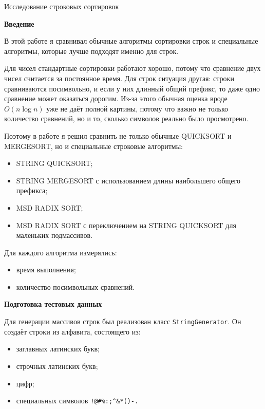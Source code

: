 \documentclass[12pt,a4paper]{article}
\begin{document}
\begin{center}
{\Large Исследование строковых сортировок}
\end{center}

\bigskip

\textbf{Введение}

В этой работе я сравнивал обычные алгоритмы сортировки строк и специальные алгоритмы, которые лучше подходят именно для строк.

Для чисел стандартные сортировки работают хорошо, потому что сравнение двух чисел считается за постоянное время. Для строк ситуация другая: строки сравниваются посимвольно, и если у них длинный общий префикс, то даже одно сравнение может оказаться дорогим. Из-за этого обычная оценка вроде $O(n \log n)$ уже не даёт полной картины, потому что важно не только количество сравнений, но и то, сколько символов реально было просмотрено.

Поэтому в работе я решил сравнить не только обычные QUICKSORT и MERGESORT, но и специальные строковые алгоритмы:
\begin{itemize}
    \item STRING QUICKSORT;
    \item STRING MERGESORT с использованием длины наибольшего общего префикса;
    \item MSD RADIX SORT;
    \item MSD RADIX SORT с переключением на STRING QUICKSORT для маленьких подмассивов.
\end{itemize}

Для каждого алгоритма измерялись:
\begin{itemize}
    \item время выполнения;
    \item количество посимвольных сравнений.
\end{itemize}

\bigskip

\textbf{Подготовка тестовых данных}

Для генерации массивов строк был реализован класс \texttt{StringGenerator}.  
Он создаёт строки из алфавита, состоящего из:
\begin{itemize}
    \item заглавных латинских букв;
    \item строчных латинских букв;
    \item цифр;
    \item специальных символов \texttt{!@\#\%:;\^{}\&*()-.}
\end{itemize}
\end{document}
